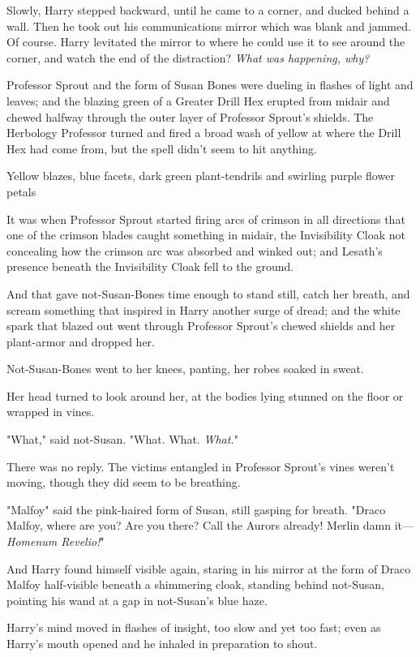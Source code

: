 Slowly, Harry stepped backward, until he came to a corner, and ducked behind a
wall. Then he took out his communications mirror{\el} which was blank and
jammed. Of course. Harry levitated the mirror to where he could use it to see
around the corner, and watch the end of the{\el} distraction? \emph{What was
happening, why?}

Professor Sprout and the form of Susan Bones were dueling in flashes of light
and leaves; and the blazing green of a Greater Drill Hex erupted from midair
and chewed halfway through the outer layer of Professor Sprout's shields. The
Herbology Professor turned and fired a broad wash of yellow at where the Drill
Hex had come from, but the spell didn't seem to hit anything.

Yellow blazes, blue facets, dark green plant-tendrils and swirling purple
flower petals{\el}

It was when Professor Sprout started firing arcs of crimson in all directions
that one of the crimson blades caught something in midair, the Invisibility
Cloak not concealing how the crimson arc was absorbed and winked out; and
Lesath's presence beneath the Invisibility Cloak fell to the ground.

And that gave not-Susan-Bones time enough to stand still, catch her breath, and
scream something that inspired in Harry another surge of dread; and the white
spark that blazed out went through Professor Sprout's chewed shields and her
plant-armor and dropped her.

Not-Susan-Bones went to her knees, panting, her robes soaked in sweat.

Her head turned to look around her, at the bodies lying stunned on the floor or
wrapped in vines.

"What," said not-Susan. "What. What. \emph{What.}"

There was no reply. The victims entangled in Professor Sprout's vines weren't
moving, though they did seem to be breathing.

"Malfoy{\el}" said the pink-haired form of Susan, still gasping for breath.
"Draco Malfoy, where are you? Are you there? Call the Aurors already! Merlin
damn it—\emph{Homenum Revelio!}"

And Harry found himself visible again, staring in his mirror at the form of
Draco Malfoy half-visible beneath a shimmering cloak, standing behind
not-Susan, pointing his wand at a gap in not-Susan's blue haze.

Harry's mind moved in flashes of insight, too slow and yet too fast; even as
Harry's mouth opened and he inhaled in preparation to shout.

